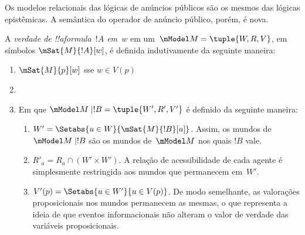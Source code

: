 \documentclass[../../../include/open-logic-section]{subfiles}
\begin{document}


Os modelos relacionais das lógicas de anúncios públicos são os mesmos
das lógicas epistêmicas. A semântica do operador de anúncio público,
porém, é nova.

\begin{defn} A \emph{verdade de !!a{formula}~$!A$
  em~$w$} em um~$\mModel M = \tuple{W, R, V}$, em símbolos
  $\mSat{M}{!A}[w]$, é definida indutivamente da seguinte maneira:
  \begin{enumerate}
  \item $\mSat{M}{p}[w]$ sse $w \in V(p)$
  \item{}
  \item{}

  
  Em que $\mModel M \mid !B = \tuple{W', R', V'}$ é definido da
  seguinte maneira:
  \begin{enumerate}
    \item $W' = \Setabs{ u \in W}{\mSat{M}{!B}[u]}$. Assim, os mundos de
      $\mModel M \mid !B$ são os mundos de~$\mModel M$ nos quais $!B$
      vale.
    \item $R'_a = R_a \cap (W' \times W')$. A relação de acessibilidade
      de cada agente é simplesmente restringida aos mundos que permanecem em~$W'$.
    \item $V'(p) = \Setabs{ u \in W'}{u \in V(p) }$. De modo semelhante,
      as valorações proposicionais nos mundos permanecem as mesmas, o que
      representa a ideia de que eventos informacionais não alteram o
      valor de verdade das variáveis proposicionais.
  \end{enumerate}
  
  \end{enumerate} 
\end{defn}
\end{document}
